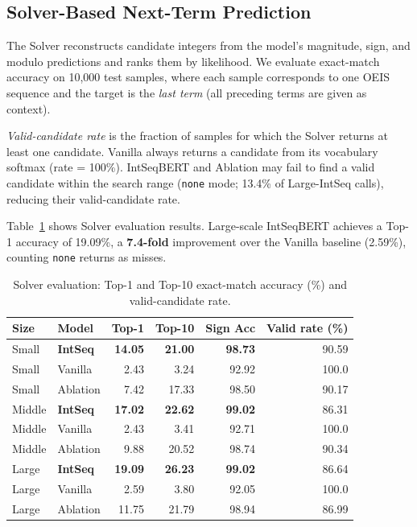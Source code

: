 \subsection{Solver-Based Next-Term Prediction}
\label{sec:solver-eval}

The Solver reconstructs candidate integers from the model's magnitude, sign, and modulo
predictions and ranks them by likelihood. We evaluate exact-match accuracy on 10,000 test
samples, where each sample corresponds to one OEIS sequence and the target is the \emph{last
term} (all preceding terms are given as context).

\emph{Valid-candidate rate} is the fraction of samples for which the Solver returns at least
one candidate. Vanilla always returns a candidate from its vocabulary softmax (rate = 100\%).
IntSeqBERT and Ablation may fail to find a valid candidate within the search range
(\texttt{none} mode; 13.4\% of Large-IntSeq calls), reducing their valid-candidate rate.

Table~\ref{tab:solver-eval} shows Solver evaluation results. Large-scale IntSeqBERT achieves
a Top-1 accuracy of 19.09\%, a \textbf{7.4-fold} improvement over the Vanilla
baseline (2.59\%), counting \texttt{none} returns as misses.

\begin{table}[htbp]
\caption{Solver evaluation: Top-1 and Top-10 exact-match accuracy (\%) and valid-candidate rate.}
\label{tab:solver-eval}
\centering
\begin{tabular}{llrrrr}
\hline
Size   & Model           & Top-1          & Top-10         & Sign Acc       & Valid rate (\%) \\
\hline
Small  & \textbf{IntSeq} & \textbf{14.05} & \textbf{21.00} & \textbf{98.73} & 90.59 \\
Small  & Vanilla         & 2.43           & 3.24           & 92.92          & 100.0 \\
Small  & Ablation        & 7.42           & 17.33          & 98.50          & 90.17 \\
Middle & \textbf{IntSeq} & \textbf{17.02} & \textbf{22.62} & \textbf{99.02} & 86.31 \\
Middle & Vanilla         & 2.43           & 3.41           & 92.71          & 100.0 \\
Middle & Ablation        & 9.88           & 20.52          & 98.74          & 90.34 \\
Large  & \textbf{IntSeq} & \textbf{19.09} & \textbf{26.23} & \textbf{99.02} & 86.64 \\
Large  & Vanilla         & 2.59           & 3.80           & 92.05          & 100.0 \\
Large  & Ablation        & 11.75          & 21.79          & 98.94          & 86.99 \\
\hline
\end{tabular}
\end{table}

